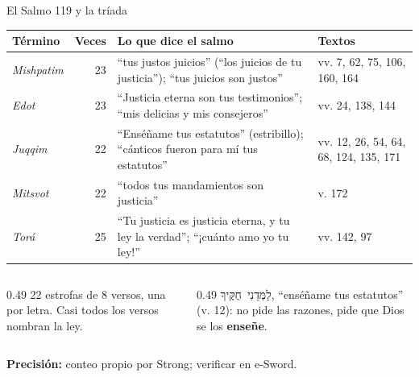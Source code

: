 \documentclass[hyperref={bookmarks=false},aspectratio=169]{beamer}
\newcommand{\heb}[1]{\mbox{\foreignlanguage{hebrew}{#1}}}
\newcommand{\destacar}[1]{\textbf{\textcolor{azul}{#1}}}
\newcommand{\precision}[1]{{\footnotesize\color{gris}\textbf{Precisión:} #1}}
\begin{document}
\begin{frame}{El Salmo 119 y la tríada}
\scriptsize\renewcommand{\arraystretch}{1.2}
\begin{tabular}{@{}>{\RaggedRight\arraybackslash}p{1.7cm}r>{\RaggedRight\arraybackslash}p{6.0cm}>{\RaggedRight\arraybackslash}p{3.0cm}@{}}
\toprule
\textbf{Término} & \textbf{Veces} & \textbf{Lo que dice el salmo} & \textbf{Textos} \\ \midrule
\emph{Mishpatim} & 23 & ``tus justos juicios'' (``los juicios de tu justicia''); ``tus juicios son justos'' & vv. 7, 62, 75, 106, 160, 164 \\
\emph{Edot} & 23 & ``Justicia eterna son tus testimonios''; ``mis delicias y mis consejeros'' & vv. 24, 138, 144 \\
\emph{Juqqim} & 22 & ``Enséñame tus estatutos'' (estribillo); ``cánticos fueron para mí tus estatutos'' & vv. 12, 26, 54, 64, 68, 124, 135, 171 \\
\emph{Mitsvot} & 22 & ``todos tus mandamientos son justicia'' & v. 172 \\
\emph{Torá} & 25 & ``Tu justicia es justicia eterna, y tu ley la verdad''; ``¡cuánto amo yo tu ley!'' & vv. 142, 97 \\
\bottomrule
\end{tabular}\par\medskip
\begin{columns}[t,onlytextwidth]
\begin{column}{0.49\textwidth}\small
22 estrofas de 8 versos, una por letra. Casi todos los versos nombran la ley.
\end{column}
\begin{column}{0.49\textwidth}\small
\heb{לַמְּדֵנִי חֻקֶּיךָ}, ``enséñame tus estatutos'' (v. 12): no pide las razones, pide que Dios se los \destacar{enseñe}.
\end{column}
\end{columns}
\precision{conteo propio por Strong; verificar en e-Sword.}
\end{frame}
\end{document}

